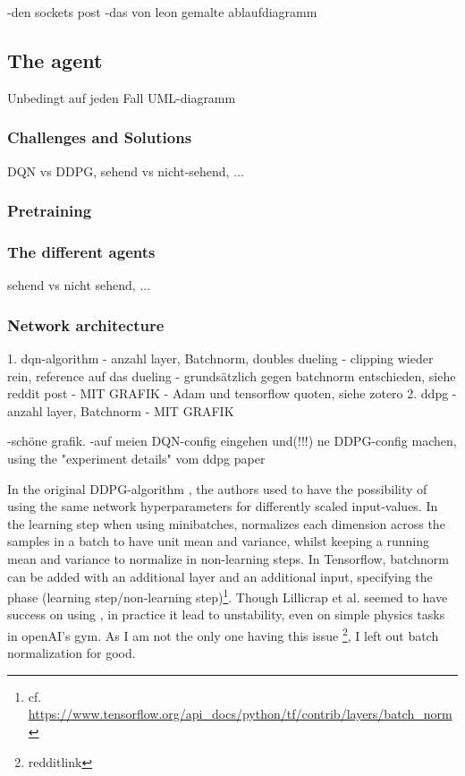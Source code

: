 -den sockets post
-das von leon gemalte ablaufdiagramm

\subsection{The agent}

Unbedingt auf jeden Fall UML-diagramm

\subsubsection{Challenges and Solutions}

DQN vs DDPG, sehend vs nicht-sehend, ...

\subsubsection{Pretraining}

\subsubsection{The different agents}

sehend vs nicht sehend, ...

\subsubsection{Network architecture}

1. dqn-algorithm
- anzahl layer, Batchnorm, doubles dueling
- clipping wieder rein, reference auf das dueling
- grundsätzlich gegen batchnorm entschieden, siehe reddit post
- MIT GRAFIK
- Adam und tensorflow quoten, siehe zotero
2. ddpg
- anzahl layer, Batchnorm
- MIT GRAFIK

-schöne grafik.
-auf meien DQN-config eingehen und(!!!) ne DDPG-config machen, using the "experiment details" vom ddpg paper  


In the original DDPG-algorithm \cite{lillicrap_continuous_2015}, the authors used  \cite{ioffe_batch_2015} to have the possibility of using the same network hyperparameters for differently scaled input-values. In the learning step when using minibatches, \batchnorm normalizes each dimension across the samples in a batch to have unit mean and variance, whilst keeping a running mean and variance to normalize in non-learning steps. In Tensorflow, batchnorm can be added with an additional layer and an additional input, specifying the phase (learning step/non-learning step)\footnote{cf. \url{https://www.tensorflow.org/api\_docs/python/tf/contrib/layers/batch_norm}}. Though Lillicrap et al. seemed to have success on using \batchnorm, in practice it lead to unstability, even on simple physics tasks in openAI's gym. As I am not the only one having this issue \footnote{redditlink}, I left out batch normalization for good.


